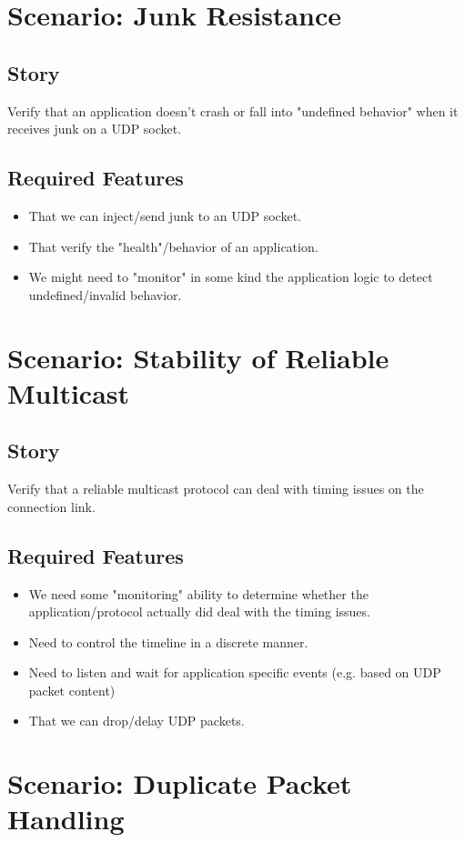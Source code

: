 \documentclass[a4paper,oneside]{book}
\begin{document}
\section{Scenario: Junk Resistance}
\subsection{Story}
Verify that an application doesn't crash or fall into "undefined behavior" when it receives junk on a UDP socket.
\subsection{Required Features}
\begin{itemize}
\item That we can inject/send junk to an UDP socket.
\item That verify the "health"/behavior of an application.
\item We might need to "monitor" in some kind the application logic to detect undefined/invalid behavior.
\end{itemize}


\section{Scenario: Stability of Reliable Multicast}
\subsection{Story}
Verify that a reliable multicast protocol can deal with timing issues on the connection link.
\subsection{Required Features}
\begin{itemize}
\item We need some "monitoring" ability to determine whether the application/protocol actually did deal with the timing issues.
\item Need to control the timeline in a discrete manner.
\item Need to listen and wait for application specific events (e.g. based on UDP packet content)
\item That we can drop/delay UDP packets.
\end{itemize}


\section{Scenario: Duplicate Packet Handling}
\end{document}

